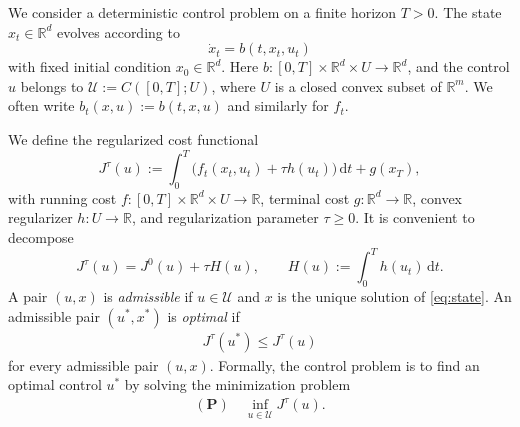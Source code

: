 \documentclass[11pt]{amsart}
\theoremstyle{plain}
\theoremstyle{definition}
\theoremstyle{remark}
\newcommand{\dd}{\,\mathrm{d}}
\begin{document}
We consider a deterministic control problem on a finite horizon $T > 0$. The state $x_t\in\mathbb R^d$ evolves according to
\begin{equation}\label{eq:state}
\dot x_t = b(t,x_t,u_t)
\end{equation}
with fixed initial condition $x_0\in\mathbb R^d$. Here $b:[0,T]\times\mathbb R^d\times U\to\mathbb R^d$, and the control $u$ belongs to $\mathcal U:=C([0,T];U)$, where $U$ is a closed convex subset of $\mathbb R^m$. We often write $b_t(x,u):=b(t,x,u)$ and similarly for $f_t$.

We define the regularized cost functional
\begin{equation}\label{eq:cost}
J^\tau(u) := \int_0^T \bigl(f_t(x_t,u_t)+\tau h(u_t)\bigr)\dd t + g(x_T),
\end{equation}
with running cost $f:[0,T]\times\mathbb R^d\times U\to\mathbb R$, terminal cost $g:\mathbb R^d\to\mathbb R$, convex regularizer $h:U\to\mathbb R$, and regularization parameter $\tau\ge 0$.
It is convenient to decompose
\[
J^\tau(u)=J^0(u)+\tau H(u),
\qquad
H(u):=\int_0^T h(u_t)\dd t.
\]
A pair $(u, x)$ is \textit{admissible} if $u\in \mathcal{U}$ and $x$ is the unique solution of \eqref{eq:state}. An admissible pair $(u^*, x^*)$ is \textit{optimal} if
\begin{align}
    J^{\tau}(u^*) \leq J^{\tau}(u) \nonumber
\end{align}
for every admissible pair $(u, x)$. Formally, the control problem is to find an optimal control $u^{*}$ by solving the minimization problem
\begin{align}
    (\mathbf{P}) \quad
    \inf_{u \in \mathcal{U}} J^\tau(u). \nonumber
\end{align}
\end{document}
